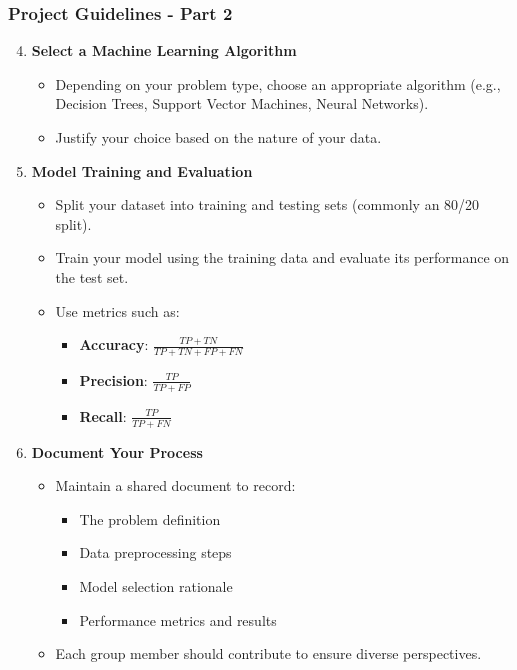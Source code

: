 \documentclass[aspectratio=169]{beamer}
\begin{document}
\begin{frame}[fragile]
  \frametitle{Project Guidelines - Part 2}
  \begin{enumerate}
    \setcounter{enumi}{3} %
    \item \textbf{Select a Machine Learning Algorithm}
    \begin{itemize}
      \item Depending on your problem type, choose an appropriate algorithm (e.g., Decision Trees, Support Vector Machines, Neural Networks).
      \item Justify your choice based on the nature of your data.
    \end{itemize}

    \item \textbf{Model Training and Evaluation}
    \begin{itemize}
      \item Split your dataset into training and testing sets (commonly an 80/20 split).
      \item Train your model using the training data and evaluate its performance on the test set.
      \item Use metrics such as:
      \begin{itemize}
        \item \textbf{Accuracy}: \(\frac{TP + TN}{TP + TN + FP + FN}\)
        \item \textbf{Precision}: \(\frac{TP}{TP + FP}\)
        \item \textbf{Recall}: \(\frac{TP}{TP + FN}\)
      \end{itemize}
    \end{itemize}

    \item \textbf{Document Your Process}
    \begin{itemize}
      \item Maintain a shared document to record:
      \begin{itemize}
        \item The problem definition
        \item Data preprocessing steps
        \item Model selection rationale
        \item Performance metrics and results
      \end{itemize}
      \item Each group member should contribute to ensure diverse perspectives.
    \end{itemize}


\end{enumerate}
\end{frame}
\end{document}
